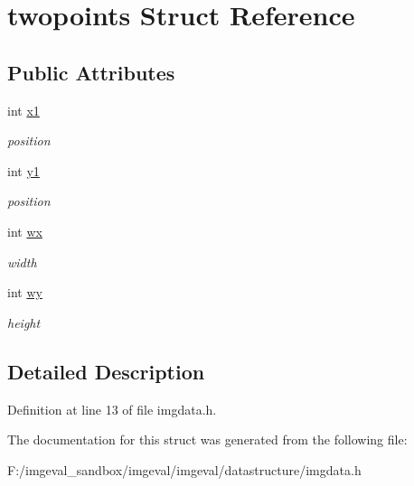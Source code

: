 \hypertarget{structtwopoints}{
\section{twopoints Struct Reference}
\label{structtwopoints}
}
\subsection*{Public Attributes}
\begin{DoxyCompactItemize}
\item 
\hypertarget{structtwopoints_ac492367380baffbaacf08f2a824e5520}{
int \hyperlink{structtwopoints_ac492367380baffbaacf08f2a824e5520}{x1}}
\label{structtwopoints_ac492367380baffbaacf08f2a824e5520}

\begin{DoxyCompactList}\small\item\em position \item\end{DoxyCompactList}\item 
\hypertarget{structtwopoints_a72f7ea31da611dd032c6900daedaaa9e}{
int \hyperlink{structtwopoints_a72f7ea31da611dd032c6900daedaaa9e}{y1}}
\label{structtwopoints_a72f7ea31da611dd032c6900daedaaa9e}

\begin{DoxyCompactList}\small\item\em position \item\end{DoxyCompactList}\item 
\hypertarget{structtwopoints_a2fd09c46cb6fbcae8413474c2a3b22a6}{
int \hyperlink{structtwopoints_a2fd09c46cb6fbcae8413474c2a3b22a6}{wx}}
\label{structtwopoints_a2fd09c46cb6fbcae8413474c2a3b22a6}

\begin{DoxyCompactList}\small\item\em width \item\end{DoxyCompactList}\item 
\hypertarget{structtwopoints_a82443a29968824824cc2627a0b2eefaf}{
int \hyperlink{structtwopoints_a82443a29968824824cc2627a0b2eefaf}{wy}}
\label{structtwopoints_a82443a29968824824cc2627a0b2eefaf}

\begin{DoxyCompactList}\small\item\em height \item\end{DoxyCompactList}\end{DoxyCompactItemize}


\subsection{Detailed Description}


Definition at line 13 of file imgdata.h.



The documentation for this struct was generated from the following file:\begin{DoxyCompactItemize}
\item 
F:/imgeval\_\-sandbox/imgeval/imgeval/datastructure/imgdata.h\end{DoxyCompactItemize}
